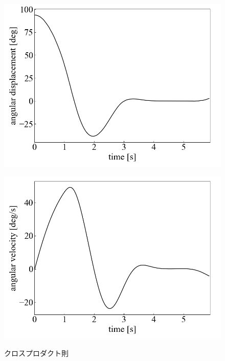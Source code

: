 \begin{figure}[h]
	\centering
	\begin{minipage}{0.43\columnwidth}
	  \centering
	  \includegraphics[width=\columnwidth]{./figure/crossdeg.png}
	  \label{fig:crossdeg}
	\end{minipage}
	\hspace{5mm}
	\begin{minipage}{0.43\columnwidth}
	  \centering
	  \includegraphics[width=\columnwidth]{./figure/crossdegpers.png}
	  \label{fig:crossdegpers}
	\end{minipage}
	\caption{クロスプロダクト則}
	\label{fig:cross}
\end{figure}


